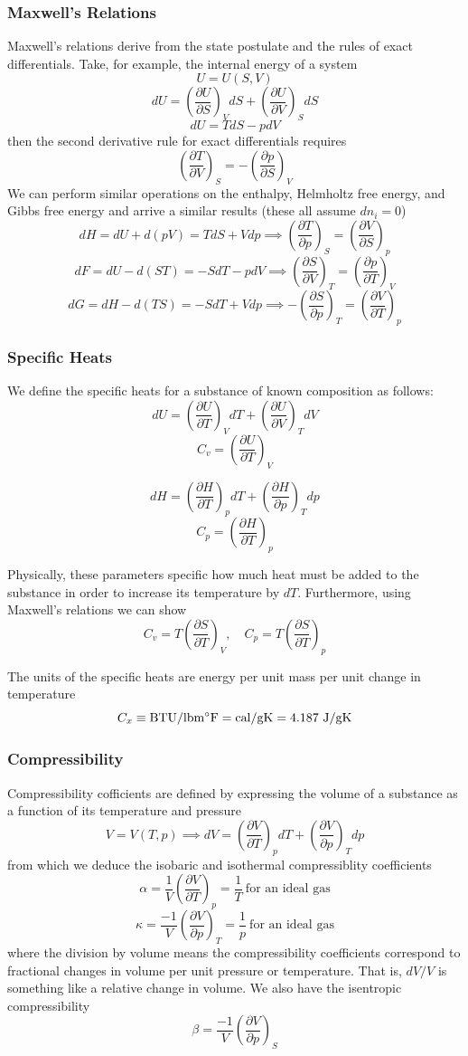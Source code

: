 \documentclass[11pt]{article}
\newcommand{\Partial}[2]{\frac{\partial #1}{\partial #2}}
\newcommand{\PartialConst}[3]{\left(\Partial{#1}{#2}\right)_{#3}}
\begin{document}
\subsubsection{Maxwell's Relations}
Maxwell's relations derive from the state postulate and the rules of exact differentials. Take, for example, the internal energy of a system
$$U = U(S,V)$$
$$dU = \PartialConst{U}{S}{V}dS + \PartialConst{U}{V}{S}dS$$
$$dU = TdS - pdV$$
then the second derivative rule for exact differentials requires
$$\PartialConst{T}{V}{S} = -\PartialConst{p}{S}{V}$$
We can perform similar operations on the enthalpy, Helmholtz free energy, and Gibbs free energy and arrive a similar results (these all assume $dn_i=0$)
$$dH = dU + d(pV) = TdS + Vdp \implies \PartialConst{T}{p}{S} = \PartialConst{V}{S}{p}$$
$$dF = dU - d(ST) = -SdT - pdV \implies \PartialConst{S}{V}{T} = \PartialConst{p}{T}{V}$$
$$dG = dH - d(TS) = -SdT + Vdp \implies -\PartialConst{S}{p}{T} = \PartialConst{V}{T}{p}$$

\subsubsection{Specific Heats}
We define the specific heats for a substance of known composition as follows:
$$dU = \PartialConst{U}{T}{V}dT + \PartialConst{U}{V}{T}dV$$
$$C_v = \PartialConst{U}{T}{V}$$

$$dH = \PartialConst{H}{T}{p}dT + \PartialConst{H}{p}{T}dp$$
$$C_p = \PartialConst{H}{T}{p}$$

Physically, these parameters specific how much heat must be added to the substance in order to increase its temperature by $dT$. Furthermore, using Maxwell's relations we can show
$$C_v = T\PartialConst{S}{T}{V},\quad C_p = T\PartialConst{S}{T}{p}$$

The units of the specific heats are energy per unit mass per unit change in temperature
$$C_x \equiv \mathrm{BTU/lbm \degree F} = \mathrm{cal/gK} = 4.187\ \mathrm{J/gK}$$

\subsubsection{Compressibility}
Compressibility cofficients are defined by expressing the volume of a substance as a function of its temperature and pressure
$$V= V(T,p)\implies dV = \PartialConst{V}{T}{p}dT + \PartialConst{V}{p}{T}dp$$
from which we deduce the isobaric and isothermal compressiblity coefficients
$$\alpha = \frac{1}{V}\PartialConst{V}{T}{p} = \frac{1}{T}\ \textrm{for an ideal gas}$$
$$\kappa = \frac{-1}{V}\PartialConst{V}{p}{T} = \frac{1}{p}\ \textrm{for an ideal gas}$$
where the division by volume means the compressibility coefficients correspond to fractional changes in volume per unit pressure or temperature. That is, $dV/V$ is something like a relative change in volume. We also have the isentropic compressibility
$$\beta=\frac{-1}{V}\PartialConst{V}{p}{S}$$
\end{document}
